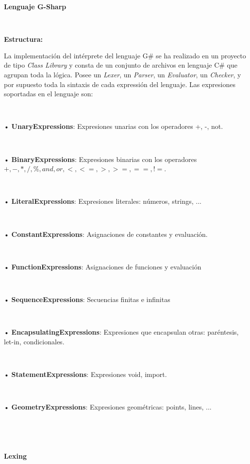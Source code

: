 \documentclass{article}
\begin{document}
\newpage

\begin{center}
	\textbf{{\Huge {Lenguaje G-Sharp}}}
\end{center}


\ 


\begin{center}
	\large\textbf{Estructura:}
\end{center}


La implementación del intérprete del lenguaje G\# se ha realizado en un proyecto de tipo \textit{Class Library} y consta de 
un conjunto de archivos en lenguaje C\# que agrupan toda la lógica. Posee un \textit{Lexer}, un \textit{Parser}, un 
\textit{Evaluator}, un \textit{Checker}, y por supuesto toda la sintaxis de cada expressión del lenguaje. Las expresiones
soportadas en el lenguaje son:


\


• \textbf{UnaryExpressions}: Expresiones unarias con los operadores +, -, not.


\ 


• \textbf{BinaryExpressions}: Expresiones binarias con los operadores $+, -, *, /, \%, and, or, <, <=, >, >=, ==, !=$. 


\ 


• \textbf{LiteralExpressions}: Expresiones literales: números, strings, ...  


\ 


• \textbf{ConstantExpressions}: Asignaciones de constantes y evaluación.


\ 


• \textbf{FunctionExpressions}: Asignaciones de funciones y evaluación


\ 


• \textbf{SequenceExpressions}: Secuencias finitas e infinitas


\ 


• \textbf{EncapsulatingExpressions}: Expresiones que encapsulan otras: paréntesis, let-in, condicionales.


\ 


• \textbf{StatementExpressions}: Expresiones void, import.  


\ 


• \textbf{GeometryExpressions}: Expresiones geométricas: points, lines, ...  


\ 



\


\begin{center}
	\large\textbf{Lexing}
\end{center}
\end{document}
